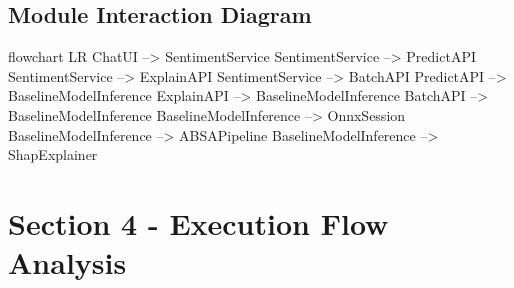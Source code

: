 \subsection{Module Interaction Diagram}
\begin{mermaidblock}
flowchart LR
  ChatUI --> SentimentService
  SentimentService --> PredictAPI
  SentimentService --> ExplainAPI
  SentimentService --> BatchAPI
  PredictAPI --> BaselineModelInference
  ExplainAPI --> BaselineModelInference
  BatchAPI --> BaselineModelInference
  BaselineModelInference --> OnnxSession
  BaselineModelInference --> ABSAPipeline
  BaselineModelInference --> ShapExplainer
\end{mermaidblock}

\section{Section 4 - Execution Flow Analysis}
